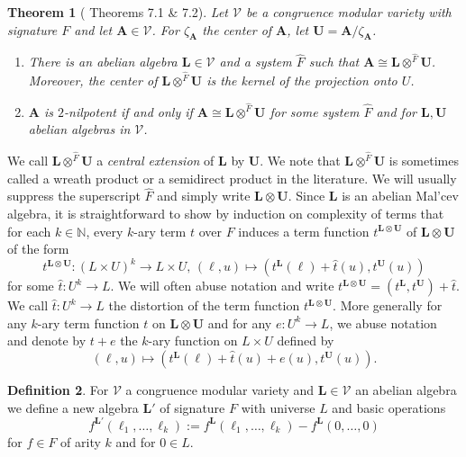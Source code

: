 \documentclass[12pt]{amsart}
\numberwithin{equation}{section}
\theoremstyle{plain}
\newtheorem{theorem}{Theorem}[section]
\theoremstyle{definition}
\newtheorem{definition}[theorem]{Definition}
\newcommand{\A}{\mathbf{A}}
\renewcommand{\L}{\mathbf{L}}
\newcommand{\N}{\mathbb{N}}
\newcommand{\U}{\mathbf{U}}
\newcommand{\V}{\mathcal{V}}
\begin{document}
\begin{theorem}[\cite{FM:CTC} Theorems 7.1 \& 7.2] 
  Let $\V$ be a congruence modular variety with signature $F$ and let $\A \in \V$. 
  For $\zeta_\A$ the center of $\A$, let $\U = \A/\zeta_\A$.
  \begin{enumerate}
    \item  
      There is an abelian algebra $\L \in \V$ and a system $\hat{F}$ such that $\A \cong \L \otimes^{\hat{F}}\U$. 
      Moreover, the center of $\L \otimes^{\hat{F}} \U$ is the kernel of the projection onto $U$. 
    \item 
      $\A$ is $2$-nilpotent if and only if $\A \cong \L \otimes^{\hat{F}}\U$ for some system $\hat{F}$ 
        and for $\L, \U$ abelian algebras in $\V$. 
  \end{enumerate}
\end{theorem}
 
We call $\L \otimes^{\hat{F}} \U$ a \emph{central extension} of $\L$ by $\U$. 
We note that $\L \otimes^{\hat{F}} \U$ is sometimes called a wreath product or a 
  semidirect product in the literature. 
We will usually suppress the superscript $\hat{F}$ and simply write $\L \otimes \U$. 
Since $\L$ is an abelian Mal'cev algebra, it is straightforward to show by induction on complexity of terms 
  that for each $k \in \N$, every $k$-ary term $t$ over $F$ induces a term function $t^{\L \otimes \U}$ of $\L \otimes \U$ of the form
  \[t^{\L \otimes \U} \colon (L \times U)^k \rightarrow L \times U, \, (\ell, u) \mapsto (t^\L(\ell) + \hat{t}(u), t^\U(u))\]
  for some $\hat{t}\colon U^k \rightarrow L$. 
We will often abuse notation and write $t^{\L \otimes \U} = (t^\L, t^\U) + \hat{t}$. 
We call $\hat{t} \colon U^k \rightarrow L$ the distortion of the term function $t^{\L \otimes \U}$. 
More generally for any $k$-ary term function $t$ on $\L \otimes \U$ and for any 
  $e \colon U^k \rightarrow L$, we abuse notation and denote by $t + e$ the $k$-ary 
  function on $L \times U$ defined by
  \[(\ell, u) \mapsto (t^\L(\ell)+\hat{t}(u) + e(u), t^\U(u)).\]
 
\begin{definition} \label{def:elprime} 
  For $\V$ a congruence modular variety and $\L \in \V$ an abelian algebra we define a new algebra $\L'$ 
    of signature $F$ with universe $L$ and basic operations 
    \[f^{\L'}(\ell_1, \ldots, \ell_k) := f^\L(\ell_1, \ldots, \ell_k) - f^\L(0, \ldots, 0)\]
    for $f \in F$ of arity $k$ and for $0 \in L$.
\end{definition}
\end{document}
